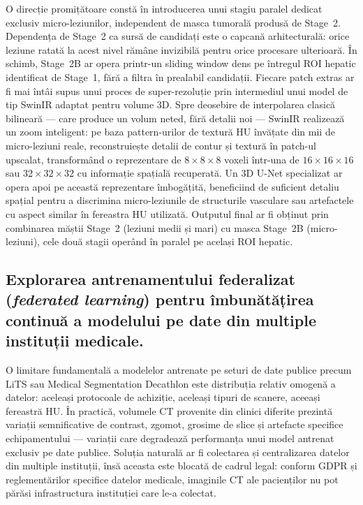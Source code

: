 \documentclass[12pt, a4paper]{report}
\begin{document}
      O direcție promițătoare constă în introducerea unui stagiu paralel dedicat
      exclusiv micro-leziunilor, independent de masca tumorală produsă de
      Stage~2. Dependența de Stage~2 ca sursă de candidați este o capcană
      arhitecturală: orice leziune ratată la acest nivel rămâne invizibilă
      pentru orice procesare ulterioară. În schimb, Stage~2B ar opera printr-un
      sliding window dens pe întregul ROI hepatic identificat de Stage~1, fără
      a filtra în prealabil candidații. Fiecare patch extras ar fi mai întâi
      supus unui proces de super-rezoluție prin intermediul unui model de tip
      SwinIR adaptat pentru volume 3D. Spre deosebire de interpolarea
      clasică bilineară — care produce un volum neted, fără detalii noi — SwinIR
      realizează un zoom inteligent: pe baza pattern-urilor de textură HU
      învățate din mii de micro-leziuni reale, reconstruiește detalii de contur
      și textură în patch-ul upscalat, transformând o reprezentare de
      $8 \times 8 \times 8$ voxeli într-una de $16 \times 16 \times 16$ sau
      $32 \times 32 \times 32$ cu informație spațială recuperată. Un
      3D U-Net specializat ar opera apoi pe această reprezentare
      îmbogățită, beneficiind de suficient detaliu spațial pentru a discrimina
      micro-leziunile de structurile vasculare sau artefactele cu aspect similar
      în fereastra HU utilizată. Outputul final ar fi obținut prin combinarea
      măștii Stage~2 (leziuni medii și mari) cu masca Stage~2B (micro-leziuni),
      cele două stagii operând în paralel pe același ROI hepatic.


\subsection{Explorarea antrenamentului federalizat (\textit{federated learning})
      pentru îmbunătățirea continuă a modelului pe date din multiple instituții
      medicale.}
      O limitare fundamentală a modelelor antrenate pe seturi de date publice
      precum LiTS sau Medical Segmentation Decathlon este distribuția relativ
      omogenă a datelor: aceleași protocoale de achiziție, aceleași tipuri de
      scanere, aceeași fereastră HU. În practică, volumele CT provenite din
      clinici diferite prezintă variații semnificative de contrast, zgomot,
      grosime de slice și artefacte specifice echipamentului — variații care
      degradează performanța unui model antrenat exclusiv pe date publice.
      Soluția naturală ar fi colectarea și centralizarea datelor din multiple
      instituții, însă aceasta este blocată de cadrul legal: conform GDPR și
      reglementărilor specifice datelor medicale, imaginile CT ale pacienților
      nu pot părăsi infrastructura instituției care le-a colectat.
\end{document}
